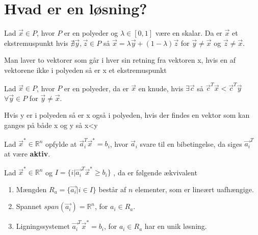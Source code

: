 \section{Hvad er en løsning?}


\begin{defn}[Ekstremuspunkt]
Lad $\vec{x} \in P$, hvor $P$ er en polyeder og $\lambda \in [0,1]$ være en skalar.
Da er $\vec{x}$ et ekstremuspunkt hvis $\nexists \vec{y}, \vec{z} \in P$ så $\vec{x} = \lambda \vec{y}+ (1- \lambda)\vec{z}$ for $\vec{y}\neq \vec{x}$ og $\vec{z}\neq \vec{x}$.
\end{defn}
Man laver to vektorer som går i hver sin retning fra vektoren x, hvis en af vektorene ikke i polyeden så er x et ekstremuspunkt

\begin{defn}[Knude]
Lad $\vec{x} \in P$, hvor $P$ er en polyeder, da er $\vec{x}$ en knude, hvis $\exists \vec{c} $ så $\vec{c}^T \vec{x} < \vec{c}^T\vec{y}$ $\forall \vec{y} \in P$ for $\vec{y} \neq \vec{x}$.
\end{defn}
Hvis y er i polyeden så er x også i polyeden, hvis der findes en vektor som kan ganges på både x og y så x<y

\begin{defn}
Lad $\vec{x}^* \in \mathds{R}^n$ opfylde at $\vec{a}_i^T\vec{x}^* = b_i$, hvor $\vec{a}_i$ svare til en bibetingelse, da siges $\vec{a_i}^T$ at være \textbf{aktiv}.
\end{defn}

\begin{stn}
Lad $\vec{x}^* \in \mathds{R}^n$ og $I = \{i | \vec{a_i}^T \vec{x}^*\geq b_i\}$ , da er følgende ækvivalent
\begin{enumerate}[label=(\alph*)]
\item Mængden $R_a =\{\vec{a_i}| i\in I\}$ består af $n$ elementer, som er lineært uafhængige.
\item Spannet $span(\vec{a_i}) = \mathds{R}^n$, for $a_i \in R_a$.
\item Ligningssystemet $\vec{a_i}^T \vec{x}^* = b_i$, for $a_i \in R_a$ har en unik løsning.
\end{enumerate}
\end{stn}

